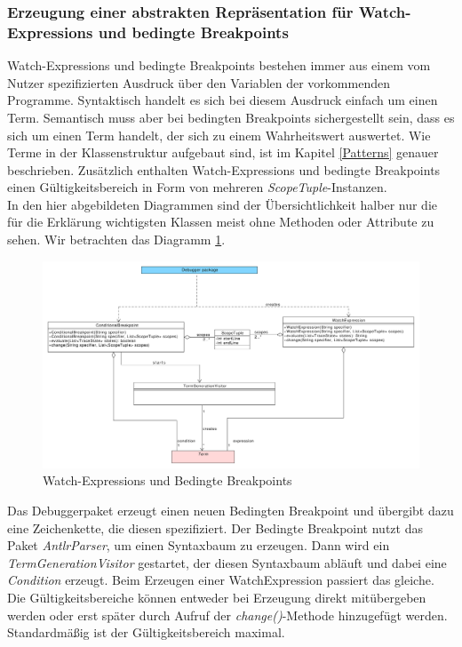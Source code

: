 \documentclass[parskip=full]{scrartcl}
\begin{document}
\subsubsection{Erzeugung einer abstrakten Repräsentation für Watch-Expressions und bedingte Breakpoints}
Watch-Expressions und bedingte Breakpoints bestehen immer aus einem vom Nutzer spezifizierten Ausdruck über den Variablen der vorkommenden Programme. Syntaktisch handelt es sich bei diesem Ausdruck einfach um einen Term. Semantisch muss aber bei bedingten Breakpoints sichergestellt sein, dass es sich um einen Term handelt, der sich zu einem Wahrheitswert auswertet. Wie Terme in der Klassenstruktur aufgebaut sind, ist im Kapitel \ref{Patterns} genauer beschrieben. Zusätzlich enthalten Watch-Expressions und bedingte Breakpoints einen Gültigkeitsbereich in Form von mehreren \textit{ScopeTuple}-Instanzen. 
\\
In den hier abgebildeten Diagrammen sind der Übersichtlichkeit halber nur die für die Erklärung wichtigsten Klassen meist ohne Methoden oder Attribute zu sehen.
Wir betrachten das Diagramm \ref{WEBBP}.  
\begin{figure}[!h]
\centering
\includegraphics[width=1.2\textwidth]{diagrammIdeenUmlet/WatchExpressions.pdf}
\caption{Watch-Expressions und Bedingte Breakpoints}
\label{WEBBP}
\end{figure}
Das Debuggerpaket erzeugt einen neuen Bedingten Breakpoint und übergibt dazu eine Zeichenkette, die diesen spezifiziert. Der Bedingte Breakpoint nutzt das Paket \textit{AntlrParser}, um einen Syntaxbaum zu erzeugen. Dann wird ein \textit{TermGenerationVisitor} gestartet, der diesen Syntaxbaum abläuft und dabei eine \textit{Condition} erzeugt. Beim Erzeugen einer WatchExpression passiert das gleiche. Die Gültigkeitsbereiche können entweder bei Erzeugung direkt mitübergeben werden oder erst später durch Aufruf der \textit{change()}-Methode hinzugefügt werden. Standardmäßig ist der Gültigkeitsbereich maximal.
\newpage
\end{document}
